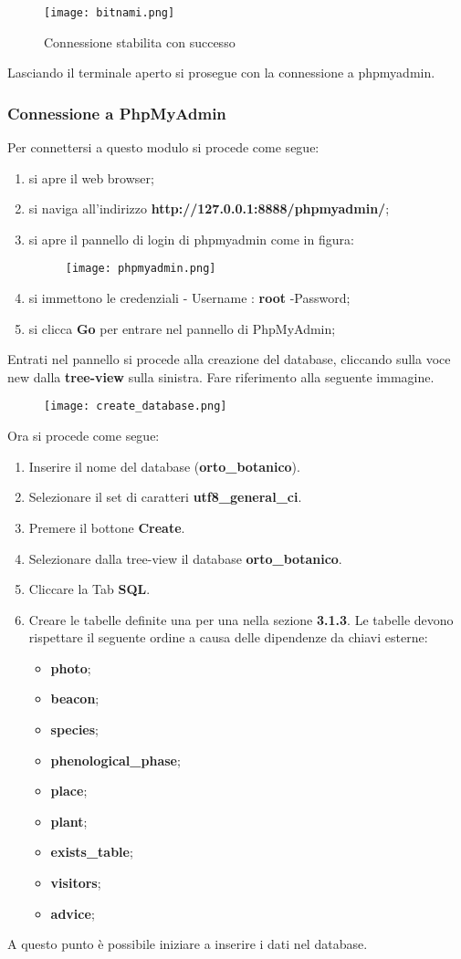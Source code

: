 \begin{figure}[h]
	\centering
	\caption{Connessione stabilita con successo}
	\texttt{[image: bitnami.png]}
\end{figure}
Lasciando il terminale aperto si prosegue con la connessione a phpmyadmin.
\subsubsection{Connessione a PhpMyAdmin}
Per connettersi a questo modulo si procede come segue:
\begin{enumerate}
\item si apre il web browser;
\item si naviga all'indirizzo \textbf{http://127.0.0.1:8888/phpmyadmin/};
\item si apre il pannello di login di phpmyadmin come in figura:
\begin{figure}[h]
	\centering
	\texttt{[image: phpmyadmin.png]}
\end{figure}


\item si immettono le credenziali - Username : \textbf{root} -Password;
\item si clicca \textbf{Go} per entrare nel pannello di PhpMyAdmin;
\end{enumerate}
\newpage
Entrati nel pannello si procede alla creazione del database, cliccando sulla voce new dalla \textbf{tree-view} sulla sinistra. Fare riferimento alla seguente immagine.
\begin{figure}[h]
	\centering
	\texttt{[image: create\_database.png]}
\end{figure}

Ora si procede come segue:
\begin{enumerate}
\item Inserire il nome del database (\textbf{orto\_botanico}).
\item Selezionare il set di caratteri \textbf{utf8\_general\_ci}.
\item Premere il bottone \textbf{Create}.
\item Selezionare dalla tree-view il database \textbf{orto\_botanico}.
\item Cliccare la Tab \textbf{SQL}.
\item Creare le tabelle definite una per una nella sezione \textbf{3.1.3}. Le tabelle devono rispettare il seguente ordine a causa delle dipendenze da chiavi esterne:
\begin{itemize}
\item \textbf{photo};
\item \textbf{beacon};
\item \textbf{species};
\item \textbf{phenological\_phase};
\item \textbf{place};
\item \textbf{plant};
\item \textbf{exists\_table};
\item \textbf{visitors};
\item \textbf{advice};
\end{itemize}
\end{enumerate}
A questo punto è possibile iniziare a inserire i dati nel database. 
\newpage
